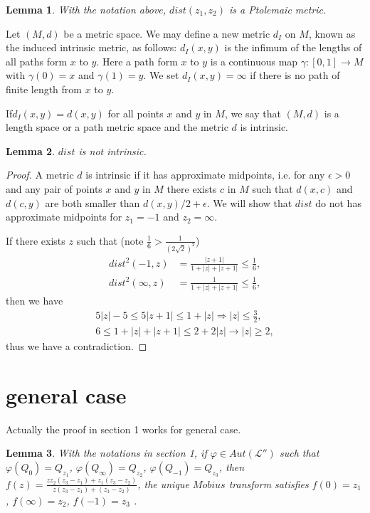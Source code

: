\documentclass{amsart}
\newcommand{\LLL}{\mathcal L} %
\newtheorem{lemma}{Lemma}[section]
\begin{document}
\begin{lemma}
With the notation above, $dist(z_1, z_2)$ is a Ptolemaic metric.
\end{lemma}

Let $(M, d)$ be a metric space. We may define a new metric $d_{I}$ on $M$, known as the
induced intrinsic metric, as follows: $d_{I}(x,y)$ is the infimum of the lengths of all
paths form $x$ to $y$. Here a path form $x$ to $y$ is a continuous map $\gamma: [0, 1] \rightarrow M$ with $\gamma(0) = x$ and $\gamma(1) = y$. We set $d_{I}(x,y) = \infty$ if
there is no path of finite length from $x$ to $y$.

If$d_{I}(x,y) = d(x,y)$ for all points $x$ and $y$ in $M$, we say that $(M, d)$ is a
length space or a path metric space and the metric $d$ is intrinsic.

\begin{lemma}
$dist$ is not intrinsic.
\end{lemma}

\begin{proof}
A metric $d$ is intrinsic if it has approximate midpoints, i.e. for any $\epsilon > 0$ and
any pair of points $x$ and $y$ in $M$ there exists $c$ in $M$ such that $d(x, c)$ and
$d(c, y)$ are both smaller than $d(x, y)/2 + \epsilon$. We will show that $dist$ do not has
approximate midpoints for $z_1 = -1$ and $z_2 = \infty$.

If there exists $z$ such that (note $\frac{1}{6} > \frac{1}{(2\sqrt{2})^2}$)
\begin{align*}
dist^2 (-1, z) &= \frac{|z+1|}{1 + |z| + |z+1|} \leq \frac{1}{6}, \\
dist^2(\infty, z) &= \frac{1}{1 + |z| + |z+1|} \leq \frac{1}{6},
\end{align*}
then we have
\begin{align*}
5|z| - 5 \leq 5|z+1| \leq 1 + |z| \Longrightarrow |z| \leq \frac{3}{2}, \\
6 \leq 1 + |z| + |z + 1| \leq 2 + 2|z| \rightarrow |z| \geq 2,
\end{align*}
thus we have a contradiction.
\end{proof}


\section{general case}
Actually the proof in section 1 works for general case.

\begin{lemma}
With the notations in section 1, if $\varphi \in Aut(\LLL'')$ such that $\varphi(Q_{0}) = Q_{z_1}$,
$\varphi(Q_{\infty}) = Q_{z_2}$, $\varphi(Q_{-1}) = Q_{z_3}$, then $f(z) = \frac{zz_2 (z_3 - z_1) + z_1(z_3 - z_2)}{z(z_3 - z_1) + (z_3 - z_2)}$, the
unique $M\ddot{o}bius$ transform satisfies $f(0) = z_1$, $f(\infty) = z_2$, $f(-1) = z_3$ .
\end{lemma}
\end{document}
